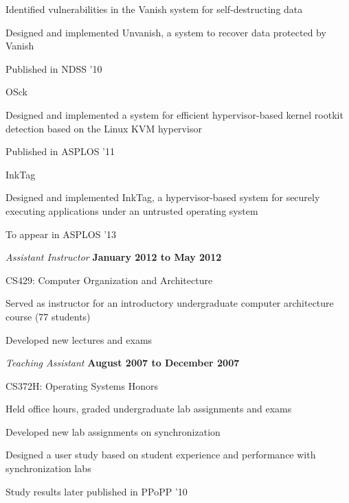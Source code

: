 \begin{outerlist}
\begin{innerlist}
        \begin{innerlist}
           \item Identified vulnerabilities in the Vanish system for
self-destructing data
           \item Designed and implemented Unvanish, a system to recover
data protected by Vanish
           \item Published in NDSS '10
         \end{innerlist}
         \item OSck
         \begin{innerlist}
            \item Designed and implemented a system for efficient
hypervisor-based kernel rootkit detection based on the Linux KVM hypervisor
            \item Published in ASPLOS '11
         \end{innerlist}
         \item InkTag
         \begin{innerlist}
            \item Designed and implemented InkTag, a hypervisor-based system
for securely executing applications under an untrusted operating system
            \item To appear in ASPLOS '13
         \end{innerlist}
    \end{innerlist}
\item[] \textit{Assistant Instructor}%
        \hfill \textbf{January 2012 to May 2012}
        \begin{innerlist}
           \item CS429: Computer Organization and Architecture
           \begin{innerlist}
              \item Served as instructor for an introductory undergraduate
computer architecture course (77 students)
              \item Developed new lectures and exams
           \end{innerlist}
        \end{innerlist}
\item[] \textit{Teaching Assistant}%
        \hfill \textbf{August 2007 to December 2007}
        \begin{innerlist}
           \item CS372H: Operating Systems Honors
           \begin{innerlist}
              \item Held office hours, graded undergraduate lab assignments and exams
              \item Developed new lab assignments on synchronization
              \item Designed a user study based on student experience and
performance with synchronization labs
              \item Study results later published in PPoPP '10
           \end{innerlist}
        \end{innerlist}
\end{outerlist}

